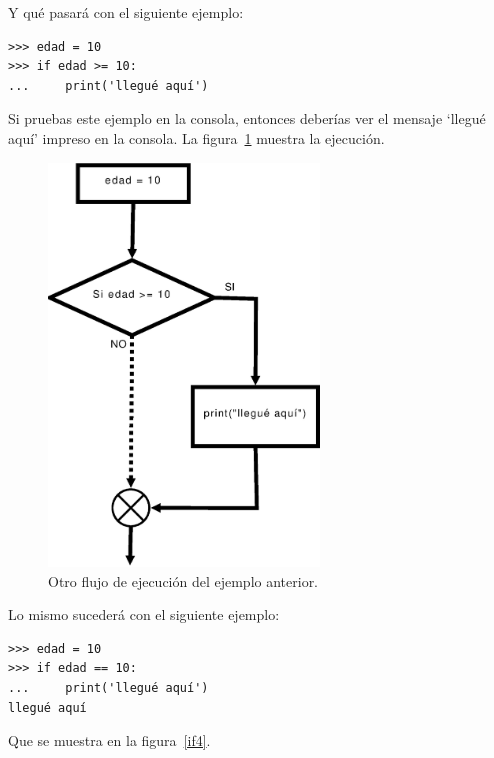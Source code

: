 Y qué pasará con el siguiente ejemplo:

\begin{listing}
\begin{verbatim}
>>> edad = 10
>>> if edad >= 10:
...     print('llegué aquí')
\end{verbatim}
\end{listing}

Si pruebas este ejemplo en la consola, entonces deberías ver el mensaje `llegué aquí' impreso en la consola. La figura~\ref{if3} muestra la ejecución.

\begin{figure}
\begin{center}
\includegraphics[width=72mm]{if3.eps}
\end{center}
\caption{Otro flujo de ejecución del ejemplo anterior.}\label{if3}
\end{figure}

Lo mismo sucederá con el siguiente ejemplo:

\begin{listing}
\begin{verbatim}
>>> edad = 10
>>> if edad == 10:
...     print('llegué aquí')
llegué aquí
\end{verbatim}
\end{listing}

Que se muestra en la figura~\ref{if4}.

